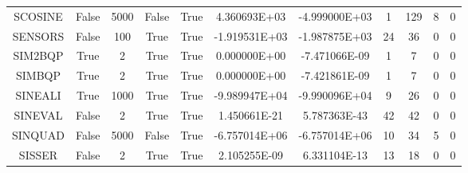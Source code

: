 \begin{longtable}{ccccccccccc}
	\cellcolor{default2} SCOSINE& \cellcolor{default2} False& \cellcolor{default2} 5000& \cellcolor{default2} False& \cellcolor{default2} True& \cellcolor{poor} 4.360693E+03& \cellcolor{best} -4.999000E+03& \cellcolor{best} 1& \cellcolor{poor} 129& \cellcolor{default2} 8& \cellcolor{default2} 0\\
	\cellcolor{default1} SENSORS& \cellcolor{default1} False& \cellcolor{default1} 100& \cellcolor{default1} True& \cellcolor{default1} True& \cellcolor{poor} -1.919531E+03& \cellcolor{best} -1.987875E+03& \cellcolor{best} 24& \cellcolor{ok} 36& \cellcolor{default1} 0& \cellcolor{default1} 0\\
	\cellcolor{default2} SIM2BQP& \cellcolor{default2} True& \cellcolor{default2} 2& \cellcolor{default2} True& \cellcolor{default2} True& \cellcolor{ok} 0.000000E+00& \cellcolor{best} -7.471066E-09& \cellcolor{best} 1& \cellcolor{poor} 7& \cellcolor{default2} 0& \cellcolor{default2} 0\\
	\cellcolor{default1} SIMBQP& \cellcolor{default1} True& \cellcolor{default1} 2& \cellcolor{default1} True& \cellcolor{default1} True& \cellcolor{ok} 0.000000E+00& \cellcolor{best} -7.421861E-09& \cellcolor{best} 1& \cellcolor{poor} 7& \cellcolor{default1} 0& \cellcolor{default1} 0\\
	\cellcolor{default2} SINEALI& \cellcolor{default2} True& \cellcolor{default2} 1000& \cellcolor{default2} True& \cellcolor{default2} True& \cellcolor{ok} -9.989947E+04& \cellcolor{best} -9.990096E+04& \cellcolor{best} 9& \cellcolor{poor} 26& \cellcolor{default2} 0& \cellcolor{default2} 0\\
	\cellcolor{default1} SINEVAL& \cellcolor{default1} False& \cellcolor{default1} 2& \cellcolor{default1} True& \cellcolor{default1} True& \cellcolor{ok} 1.450661E-21& \cellcolor{best} 5.787363E-43& \cellcolor{best} 42& \cellcolor{best} 42& \cellcolor{default1} 0& \cellcolor{default1} 0\\
	\cellcolor{default2} SINQUAD& \cellcolor{default2} False& \cellcolor{default2} 5000& \cellcolor{default2} False& \cellcolor{default2} True& \cellcolor{ok} -6.757014E+06& \cellcolor{best} -6.757014E+06& \cellcolor{best} 10& \cellcolor{poor} 34& \cellcolor{default2} 5& \cellcolor{default2} 0\\
	\cellcolor{default1} SISSER& \cellcolor{default1} False& \cellcolor{default1} 2& \cellcolor{default1} True& \cellcolor{default1} True& \cellcolor{ok} 2.105255E-09& \cellcolor{best} 6.331104E-13& \cellcolor{best} 13& \cellcolor{ok} 18& \cellcolor{default1} 0& \cellcolor{default1} 0\\

\end{longtable}
